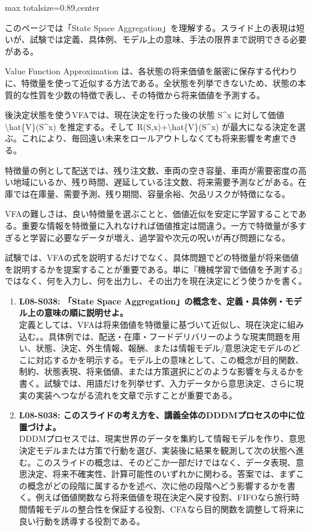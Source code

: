 \begin{minipage}[t]{0.58\textwidth}
\begin{adjustbox}{max totalsize={\textwidth}{0.89\textheight},center}
\begin{minipage}{\textwidth}\scriptsize
{}このページでは「State Space Aggregation」を理解する。スライド上の表現は短いが、試験では定義、具体例、モデル上の意味、手法の限界まで説明できる必要がある。\par
Value Function Approximation は、各状態の将来価値を厳密に保存する代わりに、特徴量を使って近似する方法である。全状態を列挙できないため、状態の本質的な性質を少数の特徴で表し、その特徴から将来価値を予測する。\par
後決定状態を使うVFAでは、現在決定を行った後の状態 S\textasciicircum{}x に対して価値 \textbackslash{}hat\{V\}(S\textasciicircum{}x) を推定する。そして R(S,x)+\textbackslash{}hat\{V\}(S\textasciicircum{}x) が最大になる決定を選ぶ。これにより、毎回遠い未来をロールアウトしなくても将来影響を考慮できる。\par
特徴量の例として配送では、残り注文数、車両の空き容量、車両が需要密度の高い地域にいるか、残り時間、遅延している注文数、将来需要予測などがある。在庫では在庫量、需要予測、残り期間、容量余裕、欠品リスクが特徴になる。\par
VFAの難しさは、良い特徴量を選ぶことと、価値近似を安定に学習することである。重要な情報を特徴量に入れなければ価値推定は間違う。一方で特徴量が多すぎると学習に必要なデータが増え、過学習や次元の呪いが再び問題になる。\par
試験では、VFAの式を説明するだけでなく、具体問題でどの特徴量が将来価値を説明するかを提案することが重要である。単に『機械学習で価値を予測する』ではなく、何を入力し、何を出力し、その出力を現在決定にどう使うかを書く。\par{}\begin{enumerate}\item \textbf{L08-S038: 「State Space Aggregation」の概念を、定義・具体例・モデル上の意味の順に説明せよ。}\\定義としては、VFAは将来価値を特徴量に基づいて近似し、現在決定に組み込む。。具体例では、配送・在庫・フードデリバリーのような現実問題を用い、状態、決定、外生情報、報酬、または情報モデル/意思決定モデルのどこに対応するかを明示する。モデル上の意味として、この概念が目的関数、制約、状態表現、将来価値、または方策選択にどのような影響を与えるかを書く。試験では、用語だけを列挙せず、入力データから意思決定、さらに現実の実装へつながる流れを文章で示すことが重要である。\item \textbf{L08-S038: このスライドの考え方を、講義全体のDDDMプロセスの中に位置づけよ。}\\DDDMプロセスでは、現実世界のデータを集約して情報モデルを作り、意思決定モデルまたは方策で行動を選び、実装後に結果を観測して次の状態へ進む。このスライドの概念は、そのどこか一部だけではなく、データ表現、意思決定、将来不確実性、計算可能性のいずれかに関わる。答案では、まずこの概念がどの段階に属するかを述べ、次に他の段階へどう影響するかを書く。例えば価値関数なら将来価値を現在決定へ戻す役割、FIFOなら旅行時間情報モデルの整合性を保証する役割、CFAなら目的関数を調整して将来に良い行動を誘導する役割である。\end{enumerate}

\end{minipage}
\end{adjustbox}
\end{minipage}
